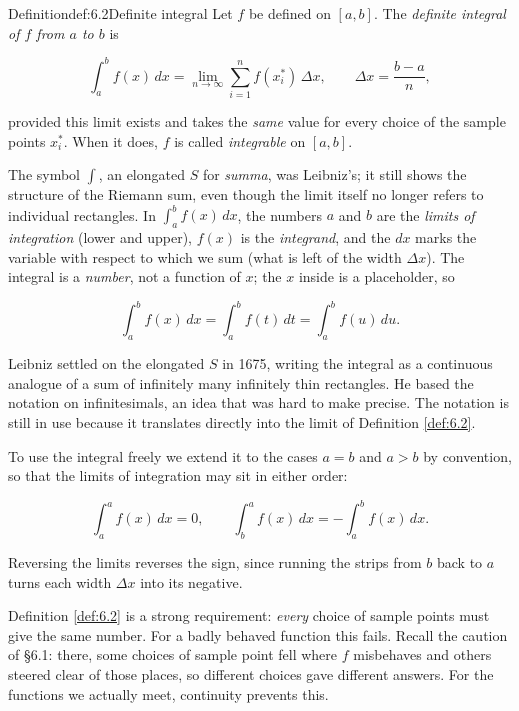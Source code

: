 \documentclass[a4paper,12pt,oneside]{memoir}
\begin{document}
\begin{envdefinition}{Definition}{def:6.2}{Definite integral}
Let \(f\) be defined on \([a, b]\). The \emph{definite integral of \(f\) from \(a\) to \(b\)} is

\[ \int_{a}^{b} f(x)\,dx = \lim_{n \to \infty} \sum_{i=1}^{n} f(x_{i}^{*})\,\Delta x, \qquad \Delta x = \frac{b - a}{n}, \]

provided this limit exists and takes the \emph{same} value for every choice of the sample points \(x_{i}^{*}\). When it does, \(f\) is called \emph{integrable} on \([a, b]\).
\end{envdefinition}
The symbol \(\int\), an elongated \(S\) for \emph{summa}, was Leibniz’s; it still shows the structure of the Riemann sum, even though the limit itself no longer refers to individual rectangles. In \(\displaystyle\int_{a}^{b} f(x)\,dx\), the numbers \(a\) and \(b\) are the \emph{limits of integration} (lower and upper), \(f(x)\) is the \emph{integrand}, and the \(dx\) marks the variable with respect to which we sum (what is left of the width \(\Delta x\)). The integral is a \emph{number}, not a function of \(x\); the \(x\) inside is a placeholder, so

\[ \int_{a}^{b} f(x)\,dx = \int_{a}^{b} f(t)\,dt = \int_{a}^{b} f(u)\,du. \]

Leibniz settled on the elongated \(S\) in 1675, writing the integral as a continuous analogue of a sum of infinitely many infinitely thin rectangles. He based the notation on infinitesimals, an idea that was hard to make precise. The notation is still in use because it translates directly into the limit of Definition \ref{def:6.2}.

To use the integral freely we extend it to the cases \(a = b\) and \(a > b\) by convention, so that the limits of integration may sit in either order:

\[ \int_{a}^{a} f(x)\,dx = 0, \qquad \int_{b}^{a} f(x)\,dx = -\int_{a}^{b} f(x)\,dx. \]

Reversing the limits reverses the sign, since running the strips from \(b\) back to \(a\) turns each width \(\Delta x\) into its negative.

Definition \ref{def:6.2} is a strong requirement: \emph{every} choice of sample points must give the same number. For a badly behaved function this fails. Recall the caution of §6.1: there, some choices of sample point fell where \(f\) misbehaves and others steered clear of those places, so different choices gave different answers. For the functions we actually meet, continuity prevents this.
\end{document}
